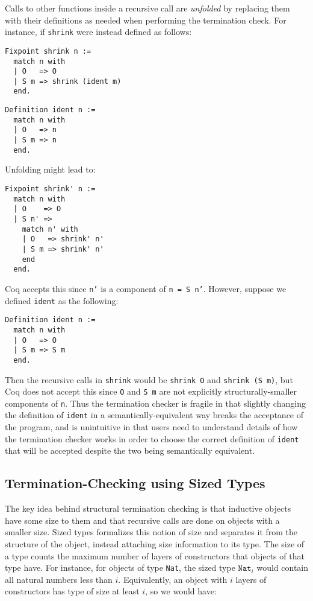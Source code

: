 \documentclass{article}
\begin{document}
Calls to other functions inside a recursive call are \textit{unfolded} by replacing them with their definitions as needed when performing the termination check. For instance, if \texttt{shrink} were instead defined as follows:

\hypertarget{shrink}{}
\begin{multicols}{2}
\begin{verbatim}
Fixpoint shrink n :=
  match n with
  | O   => O
  | S m => shrink (ident m)
  end.
\end{verbatim}
\begin{verbatim}
Definition ident n :=
  match n with
  | O   => n
  | S m => n
  end.
\end{verbatim}
\end{multicols}

Unfolding might lead to:

\begin{verbatim}
Fixpoint shrink' n :=
  match n with
  | O    => O
  | S n' =>
    match n' with
    | O   => shrink' n'
    | S m => shrink' n'
    end
  end.
\end{verbatim}

Coq accepts this since \texttt{n'} is a component of \texttt{n = S n'}. However, suppose we defined \texttt{ident} as the following:

\begin{verbatim}
Definition ident n :=
  match n with
  | O   => O
  | S m => S m
  end.
\end{verbatim}

Then the recursive calls in \texttt{shrink} would be \texttt{shrink O} and \texttt{shrink (S m)}, but Coq does not accept this since \texttt{O} and \texttt{S m} are not explicitly structurally-smaller components of \texttt{n}. Thus the termination checker is fragile in that slightly changing the definition of \texttt{ident} in a semantically-equivalent way breaks the acceptance of the program, and is unintuitive in that users need to understand details of how the termination checker works in order to choose the correct definition of \texttt{ident} that will be accepted despite the two being semantically equivalent.

\subsection{Termination-Checking using Sized Types}\label{sized-types}
The key idea behind structural termination checking is that inductive objects have some size to them and that recursive calls are done on objects with a smaller size. Sized types \cite{hughes} formalizes this notion of size and separates it from the structure of the object, instead attaching size information to its type. The size of a type counts the maximum number of layers of constructors that objects of that type have. For instance, for objects of type \texttt{Nat}, the sized type $\texttt{Nat}_i$ would contain all natural numbers less than $i$. Equivalently, an object with $i$ layers of constructors has type of size at least $i$, so we would have:
\end{document}
